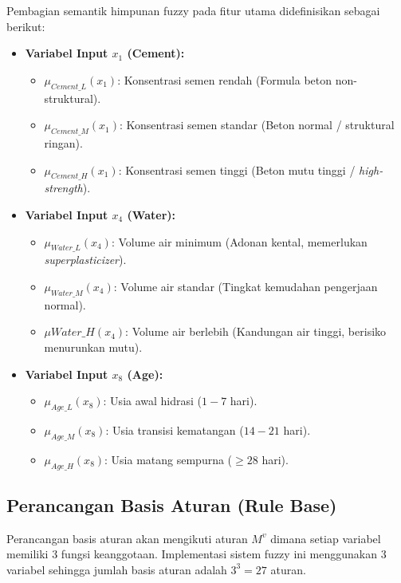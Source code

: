 Pembagian semantik himpunan fuzzy pada fitur utama didefinisikan sebagai berikut:
\begin{itemize}
    \item \textbf{Variabel Input $x_1$ (Cement):} 
    \begin{itemize}
        \item $\mu_{Cement\_L}(x_1)$: Konsentrasi semen rendah (Formula beton non-struktural).
        \item $\mu_{Cement\_M}(x_1)$: Konsentrasi semen standar (Beton normal / st\-ruk\-tural ringan).
        \item $\mu_{Cement\_H}(x_1)$: Konsentrasi semen tinggi (Beton mutu tinggi / \textit{high-strength}).
    \end{itemize}
    
    \item \textbf{Variabel Input $x_4$ (Water):}
    \begin{itemize}
        \item $\mu_{Water\_L}(x_4)$: Volume air minimum (Adonan kental, memerlukan \textit{superplasticizer}).
        \item $\mu_{Water\_M}(x_4)$: Volume air standar (Tingkat kemudahan pengerjaan normal).
        \item $\mu {Water\_H}(x_4)$: Volume air berlebih (Kandungan air ti\-nggi, be\-risiko menurunkan mutu).
    \end{itemize}
    
    \item \textbf{Variabel Input $x_8$ (Age):}
    \begin{itemize}
        \item $\mu_{Age\_L}(x_8)$: Usia awal hidrasi ($1 - 7$ hari).
        \item $\mu_{Age\_M}(x_8)$: Usia transisi kematangan ($14 - 21$ hari).
        \item $\mu_{Age\_H}(x_8)$: Usia matang sempurna ($\ge 28$ hari).
    \end{itemize}
\end{itemize}

\subsection{Perancangan Basis Aturan (Rule Base)}\label{rule_base}

Perancangan basis aturan akan mengikuti aturan $M^v$ dimana setiap variabel memiliki 3 fungsi keanggotaan.
Implementasi sistem fuzzy ini menggunakan 3 variabel sehingga jumlah basis aturan adalah $3^3 = 27$ aturan.
